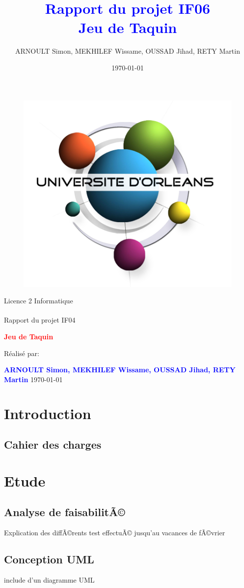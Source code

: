 \documentclass[a4paper,twoside,12pt]{report}
\title{\textcolor{blue}{\Large Rapport du projet IF06}\\\textcolor{blue}{\Large Jeu de Taquin}}
\author{ARNOULT Simon, MEKHILEF Wissame, OUSSAD Jihad, RETY Martin \date{\today}}
\begin{document}
\thispagestyle{empty}
%
\begin{figure}[H]
\includegraphics[width=0.2\linewidth]{Logo-univ-orleans.png}

\end{figure}
\vspace{2cm}
%
\begin{center}
{\Huge Licence 2 Informatique\\\ \\Rapport du projet IF04}
\par\vspace{1.4cm}

{\Huge\bf \textcolor{red}{\bf Jeu de Taquin}}
\par\vspace{1.6cm}

{\Large       Réalisé par:}
\par\vspace{1.3cm}
{\large\bf \textcolor{blue}{ARNOULT Simon, MEKHILEF Wissame, OUSSAD Jihad, RETY Martin}}
\vfill
\today
\end{center}
\newpage
\pagestyle{fancy}

\begin{abstract}
%
\end{abstract}
 
\newpage
\tableofcontents
\listoffigures
\newpage

\chapter{Introduction}
% 
\section{Cahier des charges}
%
\chapter{Etude}
%
\section{Analyse de faisabilitÃ©}
Explication des diffÃ©rents test effectuÃ© jusqu'au vacances de fÃ©vrier 
\section{Conception UML}
include d'un diagramme UML 
\end{document}
